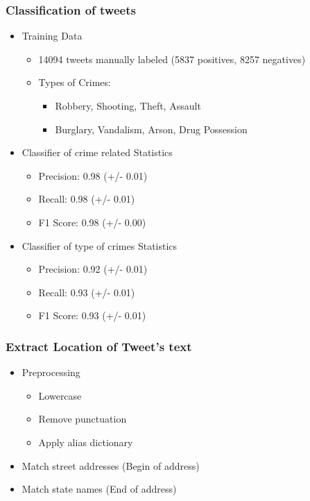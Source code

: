 \documentclass{beamer}
\begin{document}
    \begin{frame}
        \frametitle{Classification of tweets}
        \begin{itemize}
            \item<1-> Training Data
                \begin{itemize}
                    \item 14094 tweets manually labeled (5837 positives, 8257 negatives)
                    \item Types of Crimes:
                    \begin{itemize}
                        \item Robbery, Shooting, Theft, Assault
                        \item Burglary, Vandalism, Arson, Drug Possession
                    \end{itemize}
                \end{itemize}
            \item<2-> Classifier of crime related Statistics
                \begin{itemize}
                    \item Precision: 0.98 (+/- 0.01)
                    \item Recall: 0.98 (+/- 0.01)
                    \item F1 Score: 0.98 (+/- 0.00)
                \end{itemize}
            \item<3-> Classifier of type of crimes Statistics
                \begin{itemize}
                    \item Precision: 0.92 (+/- 0.01)
                    \item Recall: 0.93 (+/- 0.01) 
                    \item F1 Score: 0.93 (+/- 0.01)
                \end{itemize}
        \end{itemize}
    \end{frame}

    \begin{frame}
        \frametitle{Extract Location of Tweet's text}
        \begin{itemize}[<+->]
            \item Preprocessing
                \begin{itemize}
                    \item Lowercase
                    \item Remove punctuation
                    \item Apply alias dictionary
                \end{itemize}
            \item Match street addresses (Begin of address)
            \item Match state names (End of address)
        \end{itemize}
    \end{frame}
    
\end{document}
